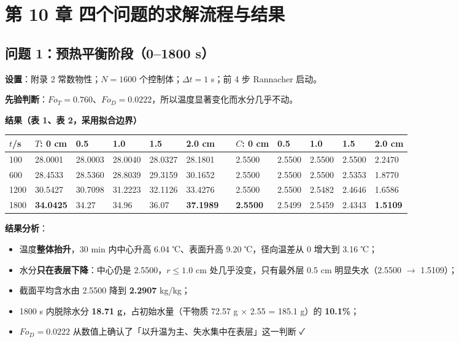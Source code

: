 \section{第 10 章 四个问题的求解流程与结果}


\subsection{问题 1：预热平衡阶段（0–1800 s）}


\textbf{设置}：附录 2 常数物性；$N=1600$ 个控制体；$\Delta t=1$ s；前 4 步 Rannacher 启动。


\textbf{先验判断}：$Fo_T=0.760$、$Fo_D=0.0222$，所以温度显著变化而水分几乎不动。


\textbf{结果（表 1、表 2，采用拟合边界）}


\begin{center}
\small
\begin{tabular}{llllllllllll}
\toprule
$t$/s & $T$: 0 cm & 0.5 & 1.0 & 1.5 & 2.0 cm &  & $C$: 0 cm & 0.5 & 1.0 & 1.5 & 2.0 cm \\
\midrule
100 & 28.0001 & 28.0003 & 28.0040 & 28.0327 & 28.1801 &  & 2.5500 & 2.5500 & 2.5500 & 2.5500 & 2.2470 \\
600 & 28.4533 & 28.5360 & 28.8039 & 29.3159 & 30.1652 &  & 2.5500 & 2.5500 & 2.5500 & 2.5353 & 1.8770 \\
1200 & 30.5427 & 30.7098 & 31.2223 & 32.1126 & 33.4276 &  & 2.5500 & 2.5500 & 2.5482 & 2.4646 & 1.6586 \\
1800 & \textbf{34.0425} & 34.27 & 34.96 & 36.07 & \textbf{37.1989} &  & \textbf{2.5500} & 2.5499 & 2.5459 & 2.4343 & \textbf{1.5109} \\
\bottomrule
\end{tabular}
\end{center}


\textbf{结果分析}：


\begin{itemize}
\item 温度\textbf{整体抬升}，30 min 内中心升高 6.04 ℃、表面升高 9.20 ℃，径向温差从 0 增大到 3.16 ℃；
\item 水分\textbf{只在表层下降}：中心仍是 2.5500，$r\le1.0$ cm 处几乎没变，只有最外层 0.5 cm 明显失水（2.5500 $\rightarrow$ 1.5109）；
\item 截面平均含水由 2.5500 降到 \textbf{2.2907} kg/kg；
\item 1800 s 内脱除水分 \textbf{18.71 g}，占初始水量（干物质 72.57 g $\times$ 2.55 = 185.1 g）的 \textbf{10.1\%}；
\item $Fo_D=0.0222$ 从数值上确认了「以升温为主、失水集中在表层」这一判断 ✓
\end{itemize}


